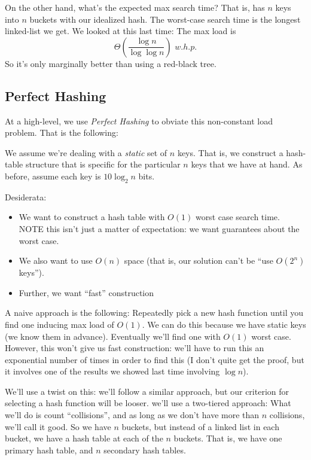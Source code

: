 \documentclass{article}
\begin{document}
On the other hand, what's the expected max search time?
That is, has $n$ keys into $n$ buckets with our idealized hash.
The worst-case search time is the longest linked-list we get.
We looked at this last time:
The max load is
$$
\Theta\left(
	\frac{\log n} {\log\log n}
\right)
\,\, w.h.p.
$$
So it's only marginally better than using a red-black tree.

\subsection{Perfect Hashing}

At a high-level, we use \textit{Perfect Hashing} to obviate this
non-constant load problem.
That is the following:

We assume we're dealing with a \textit{static} set of $n$ keys.
That is, we construct a hash-table structure that is specific for the
particular $n$ keys that we have at hand.
As before, assume each key is $10\log_2 n$ bits.

Desiderata:

\begin{itemize}

\item
We want to construct a hash table with $O(1)$ worst case search time.
NOTE this isn't just a matter of expectation: we want guarantees about
the worst case.

\item
We also want to use $O(n)$ space (that is, our solution can't be ``use $O(2^n)$ keys'').

\item
Further, we want ``fast'' construction
\end{itemize}

A naive approach is the following: Repeatedly pick a new hash function
until you find one inducing max load of $O(1)$.
We can do this because we have static keys (we know them in advance).
Eventually we'll find one with $O(1)$ worst case.
However, this won't give us fast construction:
we'll have to run this an exponential number of times in order to 
find this (I don't quite get the proof, but it involves one of the
results we showed last time involving $\log n$).

We'll use a twist on this: we'll follow a similar approach, but our
criterion for selecting a hash function will be looser.
we'll use a two-tiered approach: 
What we'll do is count ``collisions'', and as long as we don't have
more than $n$ collisions, we'll call it good.
So we have $n$ buckets, but instead of a linked list in each bucket,
we have a hash table at each of the $n$ buckets.
That is, we have one primary hash table, and $n$ secondary hash tables.
\end{document}
